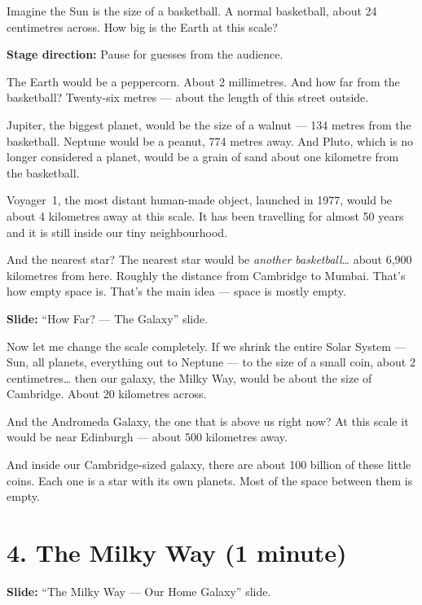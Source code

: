 \documentclass[10pt,a4paper]{article}
\newenvironment{stagenote}
  {\begin{mdframed}[linecolor=blue!50, backgroundcolor=blue!5, linewidth=1pt]%
   \small\color{blue!70!black}\textbf{Stage direction:} }
  {\end{mdframed}}
\newenvironment{slidenote}
  {\begin{mdframed}[linecolor=green!50!black, backgroundcolor=green!5, linewidth=1pt]%
   \small\color{green!40!black}\textbf{Slide:} }
  {\end{mdframed}}
\begin{document}
Imagine the Sun is the size of a basketball. A normal basketball, about 24 centimetres across. How big is the Earth at this scale?

\begin{stagenote}
Pause for guesses from the audience.
\end{stagenote}

The Earth would be a peppercorn. About 2 millimetres. And how far from the basketball? Twenty-six metres --- about the length of this street outside.

Jupiter, the biggest planet, would be the size of a walnut --- 134 metres from the basketball. Neptune would be a peanut, 774 metres away. And Pluto, which is no longer considered a planet, would be a grain of sand about one kilometre from the basketball.

Voyager~1, the most distant human-made object, launched in 1977, would be about 4 kilometres away at this scale. It has been travelling for almost 50 years and it is still inside our tiny neighbourhood.

And the nearest star? The nearest star would be \emph{another basketball}\ldots{} about 6,900 kilometres from here. Roughly the distance from Cambridge to Mumbai. That's how empty space is. That's the main idea --- space is mostly empty.

\begin{slidenote}
``How Far? --- The Galaxy'' slide.
\end{slidenote}

Now let me change the scale completely. If we shrink the entire Solar System --- Sun, all planets, everything out to Neptune --- to the size of a small coin, about 2 centimetres\ldots{} then our galaxy, the Milky Way, would be about the size of Cambridge. About 20 kilometres across.

And the Andromeda Galaxy, the one that is above us right now? At this scale it would be near Edinburgh --- about 500 kilometres away.

And inside our Cambridge-sized galaxy, there are about 100 billion of these little coins. Each one is a star with its own planets. Most of the space between them is empty.

\section*{4. The Milky Way (1 minute)}

\begin{slidenote}
``The Milky Way --- Our Home Galaxy'' slide.
\end{slidenote}
\end{document}

